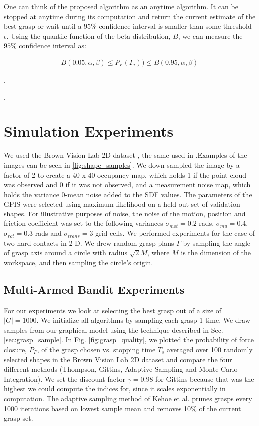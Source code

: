 \documentclass[10pt, conference]{ieeeconf}      %
\begin{document}
One can think of the proposed algorithm as an anytime algorithm. It can be stopped at anytime during its computation and return the current estimate of the best grasp or wait until a $95\%$ confidence interval is smaller than some threshold $\epsilon$. Using the quantile function of the beta distribution, $B$, we can measure the $95\%$ confidence interval as: 

\vspace{-2ex}
\begin{align}\label{eq:confidence}
B(0.05,\alpha,\beta) \leq P_F(\Gamma_i)) \leq B(0.95,\alpha,\beta)
\end{align}

\vspace{-2ex}
. 

 .
\section{Simulation Experiments}
We used the Brown Vision Lab 2D dataset \cite{brown}, the same used in \cite{christopoulos2007handling}.Examples of the images can be seen in \ref{fig:shape_samples}.  We down sampled the image by a factor of 2 to create a 40 x 40 occupancy map, which holds 1 if the point cloud was observed and 0 if it was not observed, and a measurement noise map, which holds the variance 0-mean noise added to the SDF values. The parameters of the GPIS were selected using maximum likelihood on a held-out set of validation shapes. For illustrative purposes of noise, the noise of the motion, position and friction coefficient was set to the following variances $\sigma_{mot} = 0.2$ rads, $\sigma_{mu} = 0.4$, $\sigma_{rot} = 0.3$ rads and $\sigma_{trans} = 3$ grid cells.
We performed experiments for the case of two hard contacts in 2-D. We drew random grasp plans $\Gamma$ by sampling the angle of grasp axis around a circle with radius $\sqrt{2} M$, where $M$ is the dimension of the workspace, and then sampling the circle's origin. 





\subsection{Multi-Armed Bandit Experiments}
For our experiments we look at selecting the best grasp out of a size of $|G| = 1000$. We initialize all algorithms by sampling each grasp 1 time. We draw samples from our graphical model using the technique described in Sec.  \ref{sec:grasp_sample}. In Fig. \ref{fig:grasp_quality}, we plotted the probability of force closure, $P_F$, of the grasp chosen vs. stopping time $T_s$ averaged over 100 randomly selected shapes in the Brown Vision Lab 2D dataset and compare the four different methods (Thompson, Gittins, Adaptive Sampling \cite{kehoe2012toward} and Monte-Carlo Integration). We set the discount factor $\gamma =0.98$ for Gittins because that was the highest we could compute the indices for, since it scales exponentially in computation. The adaptive sampling method of Kehoe et al. prunes grasps every 1000 iterations based on lowest sample mean and removes 10$\%$ of the current grasp set.  
\end{document}
